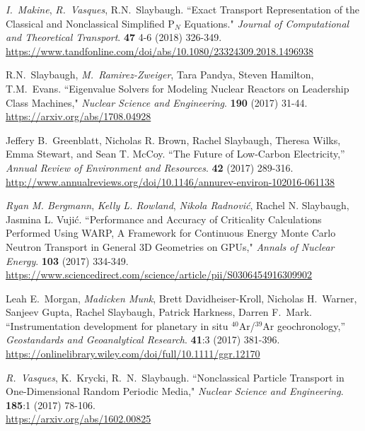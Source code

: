 \begin{bibsection}
\item \textit{I.\ Makine}, \textit{R.\ Vasques}, R.N.\ Slaybaugh. ``Exact Transport Representation of the Classical and Nonclassical Simplified P$_N$ Equations." \textit{Journal of Computational and Theoretical Transport}. \textbf{47} 4-6 (2018) 326-349.\\
\url{https://www.tandfonline.com/doi/abs/10.1080/23324309.2018.1496938}

\item R.N.\ Slaybaugh, \textit{M.\ Ramirez-Zweiger}, Tara Pandya, Steven Hamilton, T.M.\ Evans. ``Eigenvalue Solvers for Modeling Nuclear Reactors on Leadership Class Machines," \textit{Nuclear Science and Engineering}. \textbf{190} (2017) 31-44.\\
\url{https://arxiv.org/abs/1708.04928}

\item Jeffery B.\ Greenblatt, Nicholas R. Brown, Rachel Slaybaugh, Theresa Wilks, Emma Stewart, and Sean T. McCoy. ``The Future of Low-Carbon Electricity,'' \textit{Annual Review of Environment and Resources}. \textbf{42} (2017) 289-316. \\
\url{http://www.annualreviews.org/doi/10.1146/annurev-environ-102016-061138}

\item \textit{Ryan M. Bergmann}, \textit{Kelly L. Rowland}, \textit{Nikola Radnovi\'c}, Rachel N. Slaybaugh, Jasmina L. Vuji\'c. ``Performance and Accuracy of Criticality Calculations Performed Using WARP, A Framework for Continuous Energy Monte Carlo Neutron Transport in General 3D Geometries on GPUs," \textit{Annals of Nuclear Energy}. \textbf{103} (2017) 334-349.\\
\url{https://www.sciencedirect.com/science/article/pii/S0306454916309902}

\item Leah E.\ Morgan, \textit{Madicken Munk}, Brett Davidheiser-Kroll, Nicholas H.\ Warner, Sanjeev Gupta, Rachel Slaybaugh, Patrick Harkness, Darren F.\ Mark. ``Instrumentation development for planetary in situ $^{40}$Ar/$^{39}$Ar geochronology,'' \textit{Geostandards and Geoanalytical Research}. \textbf{41}:3 (2017) 381-396.\\
\url{https://onlinelibrary.wiley.com/doi/full/10.1111/ggr.12170}

\item \textit{R.\ Vasques}, K.\ Krycki, R.\ N.\ Slaybaugh. ``Nonclassical Particle Transport in One-Dimensional Random Periodic Media," \textit{Nuclear Science and Engineering}.  \textbf{185}:1 (2017) 78-106.\\
\url{https://arxiv.org/abs/1602.00825}


\end{bibsection}
